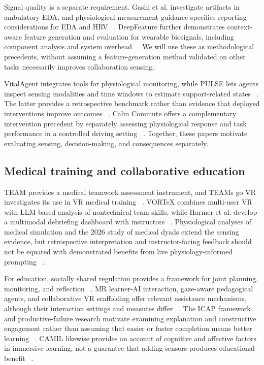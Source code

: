 Signal quality is a separate requirement. Gashi et al. investigate artifacts in ambulatory EDA, and physiological measurement guidance specifies reporting considerations for EDA and HRV ~\cite{artifacts,p61,p59}. DeepFeature further demonstrates context-aware feature generation and evaluation for wearable biosignals, including component analysis and system overhead ~\cite{deep}. We will use these as methodological precedents, without assuming a feature-generation method validated on other tasks necessarily improves collaboration sensing.

VitalAgent integrates tools for physiological monitoring, while PULSE lets agents inspect sensing modalities and time windows to estimate support-related states ~\cite{vital,pulse}. The latter provides a retrospective benchmark rather than evidence that deployed interventions improve outcomes ~\cite{pulse}. Calm Commute offers a complementary intervention precedent by separately assessing physiological response and task performance in a controlled driving setting ~\cite{calm}. Together, these papers motivate evaluating sensing, decision-making, and consequences separately.

\subsection{Medical training and collaborative education}

TEAM provides a medical teamwork assessment instrument, and TEAMs go VR investigates its use in VR medical training ~\cite{p13,p66}. VORTeX combines multi-user VR with LLM-based analysis of nontechnical team skills, while Harmer et al. develop a multimodal debriefing dashboard with instructors ~\cite{p4,p26}. Physiological analyses of medical simulation and the 2026 study of medical dyads extend the sensing evidence, but retrospective interpretation and instructor-facing feedback should not be equated with demonstrated benefits from live physiology-informed prompting ~\cite{p67,p69,huang}.

For education, socially shared regulation provides a framework for joint planning, monitoring, and reflection ~\cite{p29}. MR learner-AI interaction, gaze-aware pedagogical agents, and collaborative VR scaffolding offer relevant assistance mechanisms, although their interaction settings and measures differ ~\cite{p15,p27,p51}. The ICAP framework and productive-failure research motivate examining explanation and constructive engagement rather than assuming that easier or faster completion means better learning ~\cite{p10,p31}. CAMIL likewise provides an account of cognitive and affective factors in immersive learning, not a guarantee that adding sensors produces educational benefit ~\cite{p42}.
